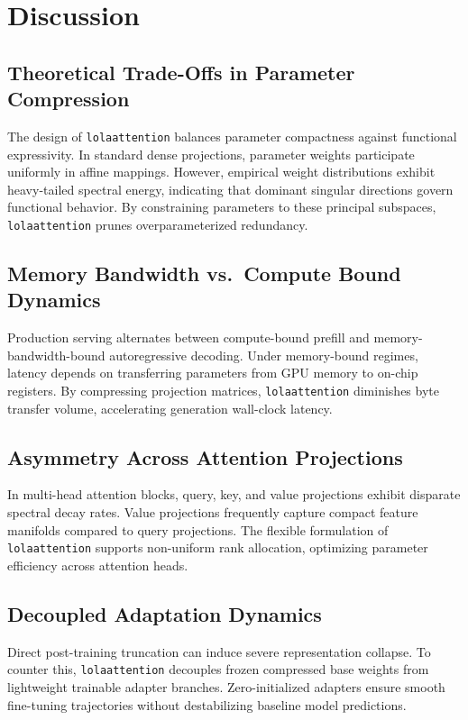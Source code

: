 \section{Discussion}

\subsection{Theoretical Trade-Offs in Parameter Compression}
The design of \texttt{lolaattention} balances parameter compactness against functional expressivity. In standard dense projections, parameter weights participate uniformly in affine mappings. However, empirical weight distributions exhibit heavy-tailed spectral energy, indicating that dominant singular directions govern functional behavior. By constraining parameters to these principal subspaces, \texttt{lolaattention} prunes overparameterized redundancy.

\subsection{Memory Bandwidth vs.\ Compute Bound Dynamics}
Production serving alternates between compute-bound prefill and memory-bandwidth-bound autoregressive decoding. Under memory-bound regimes, latency depends on transferring parameters from GPU memory to on-chip registers. By compressing projection matrices, \texttt{lolaattention} diminishes byte transfer volume, accelerating generation wall-clock latency.

\subsection{Asymmetry Across Attention Projections}
In multi-head attention blocks, query, key, and value projections exhibit disparate spectral decay rates. Value projections frequently capture compact feature manifolds compared to query projections. The flexible formulation of \texttt{lolaattention} supports non-uniform rank allocation, optimizing parameter efficiency across attention heads.

\subsection{Decoupled Adaptation Dynamics}
Direct post-training truncation can induce severe representation collapse. To counter this, \texttt{lolaattention} decouples frozen compressed base weights from lightweight trainable adapter branches. Zero-initialized adapters ensure smooth fine-tuning trajectories without destabilizing baseline model predictions.

